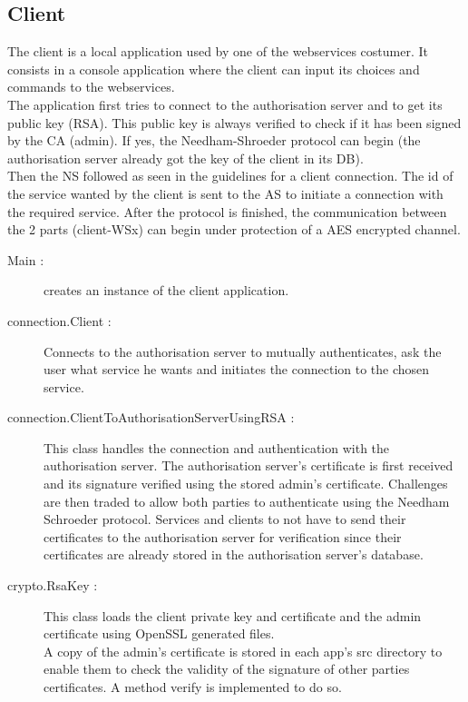 \subsection{Client}

The client is a local application used by one of the webservices costumer. It consists in a console application where the client can input its choices and commands to the webservices.\\

The application first tries to connect to the authorisation server and to get its public key (RSA). This public key is always verified to check if it has been signed by the CA (admin). If yes, the Needham-Shroeder protocol can begin (the authorisation server already got the key of the client in its DB).\\

Then the NS followed as seen in the guidelines for a client connection. The id of the service wanted by the client is sent to the AS to initiate a connection with the required service. After the protocol is finished, the communication between the 2 parts (client-WSx) can begin under protection of a AES encrypted channel.

\begin{description}

\item[Main :] creates an instance of the client application.

\item[connection.Client :] Connects to the authorisation server to mutually authenticates, ask the user what service he wants and initiates the connection to the chosen service.

\item[connection.ClientToAuthorisationServerUsingRSA :] This class handles the connection and authentication with the authorisation server. The authorisation server's certificate is first received and its signature verified using the stored admin's certificate. Challenges are then traded to allow both parties to authenticate using the Needham Schroeder protocol. Services and clients to not have to send their certificates to the authorisation server for verification since their certificates are already stored in the authorisation server's database. 

\item[crypto.RsaKey :] This class loads the client private key and certificate and the admin certificate using OpenSSL generated files. \\
A copy of the admin's certificate is stored in each app's src directory to enable them to check the validity of the signature of other parties certificates. A method verify is implemented to do so.

\end{description}


